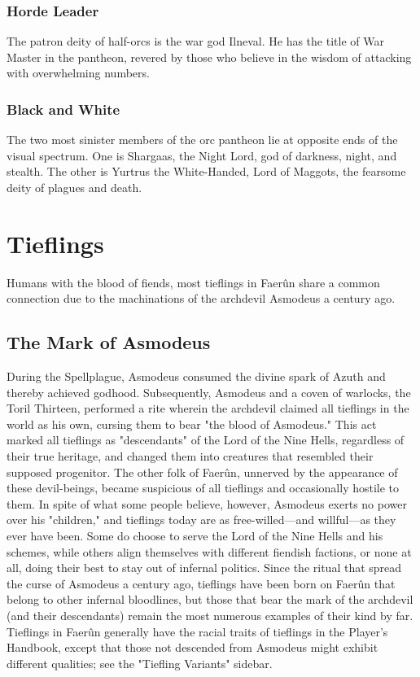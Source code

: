 \documentclass[10pt,a4paper,twoside,twocolumn,openany,bg=print,nodeprecatedcode]{dndbook}
\begin{document}
\subsubsection{Horde Leader}
The patron deity of half-orcs is the war god Ilneval. He has the title of War Master in the pantheon, revered by those who believe in the wisdom of attacking with overwhelming numbers.
\subsubsection{Black and White}
The two most sinister members of the orc pantheon lie at opposite ends of the visual spectrum. One is Shargaas, the Night Lord, god of darkness, night, and stealth. The other is Yurtrus the White-Handed, Lord of Maggots, the fearsome deity of plagues and death.
\section{Tieflings}
Humans with the blood of fiends, most tieflings in Faerûn share a common connection due to the machinations of the archdevil Asmodeus a century ago.
\subsection{The Mark of Asmodeus}
During the Spellplague, Asmodeus consumed the divine spark of Azuth and thereby achieved godhood. Subsequently, Asmodeus and a coven of warlocks, the Toril Thirteen, performed a rite wherein the archdevil claimed all tieflings in the world as his own, cursing them to bear "the blood of Asmodeus." This act marked all tieflings as "descendants" of the Lord of the Nine Hells, regardless of their true heritage, and changed them into creatures that resembled their supposed progenitor. The other folk of Faerûn, unnerved by the appearance of these devil-beings, became suspicious of all tieflings and occasionally hostile to them.
In spite of what some people believe, however, Asmodeus exerts no power over his "children," and tieflings today are as free-willed—and willful—as they ever have been. Some do choose to serve the Lord of the Nine Hells and his schemes, while others align themselves with different fiendish factions, or none at all, doing their best to stay out of infernal politics.
Since the ritual that spread the curse of Asmodeus a century ago, tieflings have been born on Faerûn that belong to other infernal bloodlines, but those that bear the mark of the archdevil (and their descendants) remain the most numerous examples of their kind by far.
Tieflings in Faerûn generally have the racial traits of tieflings in the Player's Handbook, except that those not descended from Asmodeus might exhibit different qualities; see the "Tiefling Variants" sidebar.
\end{document}
